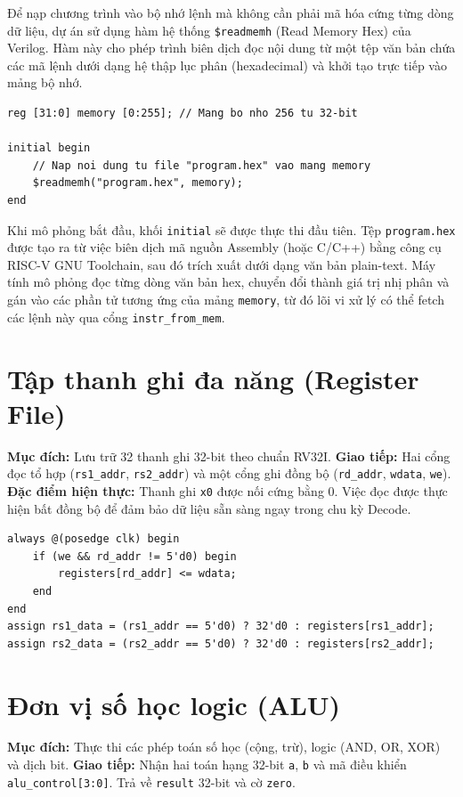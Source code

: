 Để nạp chương trình vào bộ nhớ lệnh mà không cần phải mã hóa cứng từng dòng dữ liệu, dự án sử dụng hàm hệ thống \texttt{\$readmemh} (Read Memory Hex) của Verilog. Hàm này cho phép trình biên dịch đọc nội dung từ một tệp văn bản chứa các mã lệnh dưới dạng hệ thập lục phân (hexadecimal) và khởi tạo trực tiếp vào mảng bộ nhớ.
\begin{lstlisting}[caption={Cơ chế nạp file .hex vào bộ nhớ},label={lst:readmemh}]
reg [31:0] memory [0:255]; // Mang bo nho 256 tu 32-bit

initial begin
    // Nap noi dung tu file "program.hex" vao mang memory
    $readmemh("program.hex", memory);
end
\end{lstlisting}
Khi mô phỏng bắt đầu, khối \texttt{initial} sẽ được thực thi đầu tiên. Tệp \texttt{program.hex} được tạo ra từ việc biên dịch mã nguồn Assembly (hoặc C/C++) bằng công cụ RISC-V GNU Toolchain, sau đó trích xuất dưới dạng văn bản plain-text. Máy tính mô phỏng đọc từng dòng văn bản hex, chuyển đổi thành giá trị nhị phân và gán vào các phần tử tương ứng của mảng \texttt{memory}, từ đó lõi vi xử lý có thể fetch các lệnh này qua cổng \texttt{instr\_from\_mem}.

\section{Tập thanh ghi đa năng (Register File)}
\textbf{Mục đích:} Lưu trữ 32 thanh ghi 32-bit theo chuẩn RV32I.
\textbf{Giao tiếp:} Hai cổng đọc tổ hợp (\texttt{rs1\_addr}, \texttt{rs2\_addr}) và một cổng ghi đồng bộ (\texttt{rd\_addr}, \texttt{wdata}, \texttt{we}).
\textbf{Đặc điểm hiện thực:} Thanh ghi \texttt{x0} được nối cứng bằng 0. Việc đọc được thực hiện bất đồng bộ để đảm bảo dữ liệu sẵn sàng ngay trong chu kỳ Decode.

\begin{lstlisting}[caption={Hiện thực Register File},label={lst:reg_file}]
always @(posedge clk) begin
    if (we && rd_addr != 5'd0) begin
        registers[rd_addr] <= wdata;
    end
end
assign rs1_data = (rs1_addr == 5'd0) ? 32'd0 : registers[rs1_addr];
assign rs2_data = (rs2_addr == 5'd0) ? 32'd0 : registers[rs2_addr];
\end{lstlisting}

\section{Đơn vị số học logic (ALU)}
\textbf{Mục đích:} Thực thi các phép toán số học (cộng, trừ), logic (AND, OR, XOR) và dịch bit.
\textbf{Giao tiếp:} Nhận hai toán hạng 32-bit \texttt{a}, \texttt{b} và mã điều khiển \texttt{alu\_control[3:0]}. Trả về \texttt{result} 32-bit và cờ \texttt{zero}.

